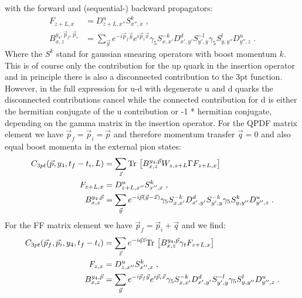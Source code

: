 \documentclass[a4paper,10pt]{scrartcl}
\newcommand{\tr}{\text{Tr\,}}
\begin{document}
with the forward and (sequential-) backward propagators:
\begin{align}
    F_{z+L,x} &= D^u_{z+L,x''} S^k_{x'',x} \;, \\
    B^{y_4,\vec p_f, \vec p_i}_{x,z} &= \sum_{\vec y} e^{-i \vec p_f \vec y} e^{i \vec p_i \vec x} \gamma_5 S^{-k}_{x,x'} D^d_{x',y'} S^{-l}_{y',y} \gamma_5 S^l_{y,y''} D^u_{y'',z} \;.
\end{align} 
Where the $S^k$ stand for gaussian smearing operators with boost momentum $k$. This is of course only the contribution for the up quark in the
insertion operator and in principle there is also a disconnected contribution to the 3pt function. However, in the full expression for u-d with 
degenerate u and d quarks the disconnected contributions cancel while the connected contribution for d is either the hermitian conjugate of the u contribution or 
-1 * hermitian conjugate, depending on the gamma matrix in the insertion operator.
\newline
For the QPDF matrix element we have $\vec p_f = \vec p_i = \vec p$ and therefore momentum transfer $\vec q = 0$ and also equal boost momenta in
the external pion states:
\begin{align}
    C_{3pt}(\vec p,y_4,t_f-t_i,L) &=  \sum_{\vec{z}} \tr \left[B^{y_4,\vec p}_{x,z} W_{z,z+L} \Gamma F_{z+L,x} \right] \;  \\
    F_{z+L,x} &= D^u_{z+L,x''} S^k_{x'',x} \;, \\
    B^{y_4,\vec p}_{x,z} &= \sum_{\vec y} e^{-i \vec p ( \vec y- \vec x)} \gamma_5 S^{-k}_{x,x'} D^d_{x',y'} S^{-k}_{y',y} \gamma_5 S^k_{y,y''} D^u_{y'',z} \;.
\end{align}
For the FF matrix element we have $\vec p_f = \vec p_i + \vec q$ and we find:
\begin{align}
    C_{3pt}(\vec p_f, \vec{p}_i,y_4,t_f-t_i) &=  \sum_{\vec{z}} e^{- i \vec q \vec z} \tr \left[B^{y_4,\vec p}_{x,z} \gamma_t F_{z+L,x} \right] \;  \\
    F_{z,x} &= D^u_{z,x''} S^k_{x'',x} \;, \\
    B^{y_4,\vec p}_{x,z} &= \sum_{\vec y} e^{-i \vec p_f\vec y} e^{i \vec p_i\vec x} \gamma_5 S^{-k}_{x,x'} D^d_{x',y'} S^{-l}_{y',y} \gamma_5 S^{l}_{y,y''} D^u_{y'',z} \;.
\end{align}
\end{document}
